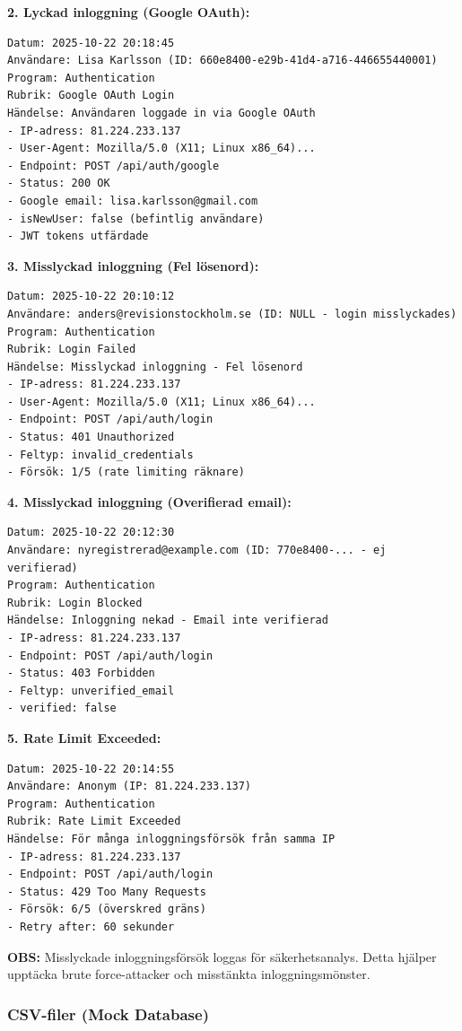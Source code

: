 \documentclass[12pt,a4paper]{article}
\begin{document}
\textbf{2. Lyckad inloggning (Google OAuth):}
\begin{verbatim}
Datum: 2025-10-22 20:18:45
Användare: Lisa Karlsson (ID: 660e8400-e29b-41d4-a716-446655440001)
Program: Authentication
Rubrik: Google OAuth Login
Händelse: Användaren loggade in via Google OAuth
- IP-adress: 81.224.233.137
- User-Agent: Mozilla/5.0 (X11; Linux x86_64)...
- Endpoint: POST /api/auth/google
- Status: 200 OK
- Google email: lisa.karlsson@gmail.com
- isNewUser: false (befintlig användare)
- JWT tokens utfärdade
\end{verbatim}

\textbf{3. Misslyckad inloggning (Fel lösenord):}
\begin{verbatim}
Datum: 2025-10-22 20:10:12
Användare: anders@revisionstockholm.se (ID: NULL - login misslyckades)
Program: Authentication
Rubrik: Login Failed
Händelse: Misslyckad inloggning - Fel lösenord
- IP-adress: 81.224.233.137
- User-Agent: Mozilla/5.0 (X11; Linux x86_64)...
- Endpoint: POST /api/auth/login
- Status: 401 Unauthorized
- Feltyp: invalid_credentials
- Försök: 1/5 (rate limiting räknare)
\end{verbatim}

\textbf{4. Misslyckad inloggning (Overifierad email):}
\begin{verbatim}
Datum: 2025-10-22 20:12:30
Användare: nyregistrerad@example.com (ID: 770e8400-... - ej verifierad)
Program: Authentication
Rubrik: Login Blocked
Händelse: Inloggning nekad - Email inte verifierad
- IP-adress: 81.224.233.137
- Endpoint: POST /api/auth/login
- Status: 403 Forbidden
- Feltyp: unverified_email
- verified: false
\end{verbatim}

\textbf{5. Rate Limit Exceeded:}
\begin{verbatim}
Datum: 2025-10-22 20:14:55
Användare: Anonym (IP: 81.224.233.137)
Program: Authentication
Rubrik: Rate Limit Exceeded
Händelse: För många inloggningsförsök från samma IP
- IP-adress: 81.224.233.137
- Endpoint: POST /api/auth/login
- Status: 429 Too Many Requests
- Försök: 6/5 (överskred gräns)
- Retry after: 60 sekunder
\end{verbatim}

\textbf{OBS:} Misslyckade inloggningsförsök loggas för säkerhetsanalys. Detta hjälper upptäcka brute force-attacker och misstänkta inloggningsmönster.

\subsubsection{CSV-filer (Mock Database)}
\end{document}
